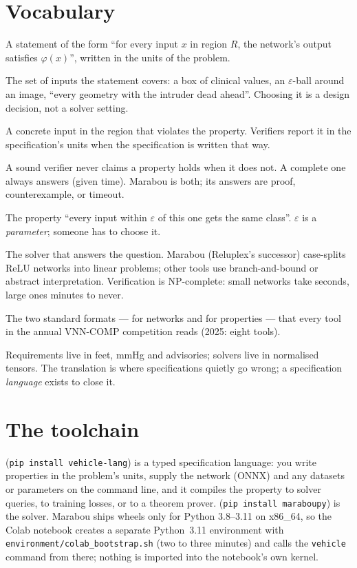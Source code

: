 \documentclass[11pt]{article}
\begin{document}
\section{Vocabulary}
\begin{description}[style=nextline,itemsep=1pt]
  \item[Property / specification] A statement of the form ``for every input $x$ in region $R$, the network's output satisfies $\varphi(x)$'', written in the units of the problem.
  \item[Region] The set of inputs the statement covers: a box of clinical values, an $\varepsilon$-ball around an image, ``every geometry with the intruder dead ahead''. Choosing it is a design decision, not a solver setting.
  \item[Counterexample] A concrete input in the region that violates the property. Verifiers report it in the specification's units when the specification is written that way.
  \item[Sound / complete] A sound verifier never claims a property holds when it does not. A complete one always answers (given time). Marabou is both; its answers are proof, counterexample, or timeout.
  \item[Robustness, $\varepsilon$-ball] The property ``every input within $\varepsilon$ of this one gets the same class''. $\varepsilon$ is a \emph{parameter}; someone has to choose it.
  \item[Verifier] The solver that answers the question. Marabou (Reluplex's successor) case-splits ReLU networks into linear problems; other tools use branch-and-bound or abstract interpretation. Verification is NP-complete: small networks take seconds, large ones minutes to never.
  \item[ONNX / VNN-LIB] The two standard formats — for networks and for properties — that every tool in the annual VNN-COMP competition reads (2025: eight tools).
  \item[Embedding gap] Requirements live in feet, mmHg and advisories; solvers live in normalised tensors. The translation is where specifications quietly go wrong; a specification \emph{language} exists to close it.
\end{description}

\section{The toolchain}
 (\texttt{pip install vehicle-lang}) is a typed specification language: you write properties in the problem's units, supply the network (ONNX) and any datasets or parameters on the command line, and it compiles the property to solver queries, to training losses, or to a theorem prover.  (\texttt{pip install maraboupy}) is the solver. Marabou ships wheels only for Python 3.8–3.11 on x86\_64, so the Colab notebook creates a separate Python~3.11 environment with \texttt{environment/colab\_bootstrap.sh} (two to three minutes) and calls the \texttt{vehicle} command from there; nothing is imported into the notebook's own kernel.
\end{document}
